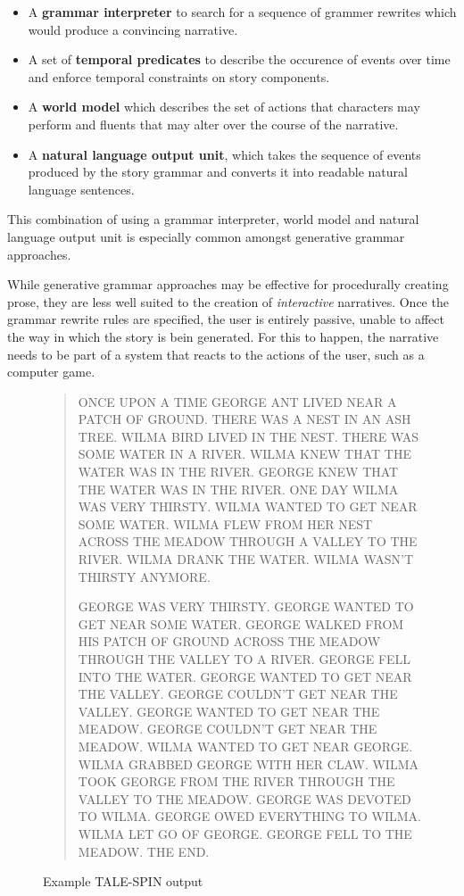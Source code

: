 \begin{itemize}
  \item A \textbf{grammar interpreter} to search for a sequence of grammer rewrites which would produce a convincing narrative.
  \item A set of \textbf{temporal predicates} to describe the occurence of events over time and enforce temporal constraints on story components.
  \item A \textbf{world model} which describes the set of actions that characters may perform and fluents that may alter over the course of the narrative.
  \item A \textbf{natural language output unit}, which takes the sequence of events produced by the story grammar and converts it into readable natural language sentences.
\end{itemize}

This combination of using a grammar interpreter, world model and natural language output unit is especially common amongst generative grammar approaches.

While generative grammar approaches may be effective for procedurally creating prose, they are less well suited to the creation of \emph{interactive} narratives. Once the grammar rewrite rules are specified, the user is entirely passive, unable to affect the way in which the story is bein generated. For this to happen, the narrative needs to be part of a system that reacts to the actions of the user, such as a computer game.

\begin{figure}[!t]
\begin{quote}
  ONCE UPON A TIME GEORGE ANT LIVED NEAR A PATCH OF GROUND. THERE WAS A NEST IN AN ASH TREE. WILMA BIRD LIVED IN THE NEST. THERE WAS SOME WATER IN A RIVER. WILMA KNEW THAT THE WATER WAS IN THE RIVER. GEORGE KNEW THAT THE WATER WAS IN THE RIVER. ONE DAY WILMA WAS VERY THIRSTY. WILMA WANTED TO GET NEAR SOME WATER. WILMA FLEW FROM HER NEST ACROSS THE MEADOW THROUGH A VALLEY TO THE RIVER. WILMA DRANK THE WATER. WILMA WASN'T THIRSTY ANYMORE.

GEORGE WAS VERY THIRSTY. GEORGE WANTED TO GET NEAR SOME WATER. GEORGE WALKED FROM HIS PATCH OF GROUND ACROSS THE MEADOW THROUGH THE VALLEY TO A RIVER. GEORGE FELL INTO THE WATER. GEORGE WANTED TO GET NEAR THE VALLEY. GEORGE COULDN'T GET NEAR THE VALLEY. GEORGE WANTED TO GET NEAR THE MEADOW. GEORGE COULDN'T GET NEAR THE MEADOW. WILMA WANTED TO GET NEAR GEORGE. WILMA GRABBED GEORGE WITH HER CLAW. WILMA TOOK GEORGE FROM THE RIVER THROUGH THE VALLEY TO THE MEADOW. GEORGE WAS DEVOTED TO WILMA. GEORGE OWED EVERYTHING TO WILMA. WILMA LET GO OF GEORGE. GEORGE FELL TO THE MEADOW. THE END.
\end{quote}
\caption{Example TALE-SPIN output}\label{fig:tspin}
\end{figure}

